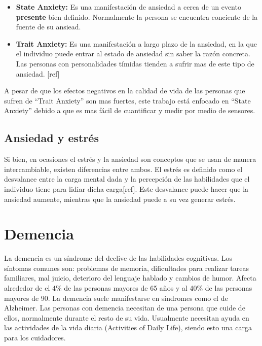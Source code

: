 \begin{itemize}
	\item{\textbf{State Anxiety:}} Es una manifestaci\'on de ansiedad a cerca de un evento \textbf{presente} bien definido. Normalmente la persona se encuentra conciente de la fuente de su ansiead. 
	\item{\textbf{Trait Anxiety:}} Es una manifestaci\'on a largo plazo de la ansiedad, en la que el individuo puede entrar al estado de ansiedad sin saber la raz\'on concreta. Las personas con personalidades t\'imidas tienden a sufrir mas de este tipo de ansiedad. [ref]

\end{itemize}

A pesar de que los efectos negativos en la calidad de vida de las personas que sufren de ``Trait Anxiety'' son mas fuertes, este trabajo est\'a enfocado en ``State Anxiety'' debido a que es mas f\'acil de cuantificar y medir por medio de sensores.

\subsection{Ansiedad y estr\'es}\label{secc:anxietyandstress}
Si bien, en ocasiones el estr\'es y la ansiedad son conceptos que se usan de manera intercambiable, existen diferencias entre ambos. El estr\'es es definido como el desvalance entre la carga mental dada y la percepci\'on de las habilidades que el individuo tiene para lidiar dicha carga[ref]. Este desvalance puede hacer que la ansiedad aumente, mientras que la ansiedad puede a su vez generar estr\'es.

\section{Demencia}\label{secc:dementia}
La demencia es un s\'indrome del declive de las habilidades cognitivas. Los s\'intomas comunes son: problemas de memoria, dificultades para realizar tareas familiares, mal juicio, deterioro del lenguaje hablado y cambios de humor\citep{Aziz}. Afecta alrededor de el 4\% de las personas mayores de 65 a\~nos y al 40\% de las personas mayores de 90. La demencia suele manifestarse en sindromes como el de Alzheimer. Las personas con demencia necesitan de una persona que cuide de ellos, normalmente durante el resto de su vida. Usualmente necesitan ayuda en las actividades de la vida diaria (Activities of Daily Life), siendo esto una carga para los cuidadores.

